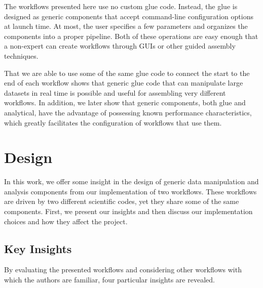 \documentclass[conference]{IEEEtran}
\begin{document}
The workflows presented here use no custom glue code. Instead, the glue is
designed as generic components that accept command-line configuration options
at launch time. At most, the user specifies a few parameters and organizes
the components into a proper pipeline. Both of these operations are easy enough
that a non-expert
can create workflows through GUIs or other guided assembly techniques.

That we are able to use some of the same glue code to connect the start to the
end of each workflow shows that generic glue code that can manipulate large
datasets in real time is possible and useful for assembling very different
workflows.  In addition, we later show that generic components, both glue and
analytical, have the advantage of possessing known performance characteristics,
which greatly facilitates the configuration of workflows that use them.

\section{Design}
\label{s:design}

In this work, we offer some insight in the design of generic data manipulation
and analysis components from our implementation of two workflows. These
workflows are driven by two different scientific codes, yet they share some of
the same components. First, we present our insights and then discuss our
implementation choices and how they affect the project.

\subsection{Key Insights}

By evaluating the presented workflows and considering other workflows with
which the authors are familiar, four particular insights are revealed.
\end{document}

